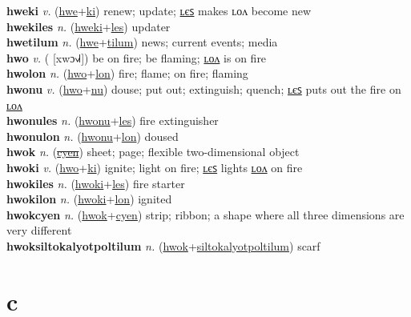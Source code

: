 \textbf{hweki} \textit{v.} (\hyperref[hwe]{hwe}+\hyperref[ki]{ki})
renew; update; \hyperref[hwekiles]{ʟєꜱ} makes ʟᴏᴧ become new \label{hweki} \\
\textbf{hwekiles} \textit{n.} (\hyperref[hweki]{hweki}+\hyperref[les]{les})
updater \label{hwekiles} \\
\textbf{hwetilum} \textit{n.} (\hyperref[hwe]{hwe}+\hyperref[tilum]{tilum})
news; current events; media \label{hwetilum} \\
\textbf{hwo} \textit{v.} ( [xwɔ˧˩˧])
be on fire; be flaming; \hyperref[hwolon]{ʟᴏᴧ} is on fire \label{hwo} \\
\textbf{hwolon} \textit{n.} (\hyperref[hwo]{hwo}+\hyperref[lon]{lon})
fire; flame; on fire; flaming \label{hwolon} \\
\textbf{hwonu} \textit{v.} (\hyperref[hwo]{hwo}+\hyperref[nu]{nu})
douse; put out; extinguish; quench; \hyperref[hwonules]{ʟєꜱ} puts out the fire on \hyperref[hwonulon]{ʟᴏᴧ} \label{hwonu} \\
\textbf{hwonules} \textit{n.} (\hyperref[hwonu]{hwonu}+\hyperref[les]{les})
fire extinguisher \label{hwonules} \\
\textbf{hwonulon} \textit{n.} (\hyperref[hwonu]{hwonu}+\hyperref[lon]{lon})
doused \label{hwonulon} \\
\textbf{hwok} \textit{n.} (\hyperref[cyen]{\sout{cyen}})
sheet; page; flexible two-dimensional object \label{hwok} \\
\textbf{hwoki} \textit{v.} (\hyperref[hwo]{hwo}+\hyperref[ki]{ki})
ignite; light on fire; \hyperref[hwokiles]{ʟєꜱ} lights \hyperref[hwokilon]{ʟᴏᴧ} on fire \label{hwoki} \\
\textbf{hwokiles} \textit{n.} (\hyperref[hwoki]{hwoki}+\hyperref[les]{les})
fire starter \label{hwokiles} \\
\textbf{hwokilon} \textit{n.} (\hyperref[hwoki]{hwoki}+\hyperref[lon]{lon})
ignited \label{hwokilon} \\
\textbf{hwokcyen} \textit{n.} (\hyperref[hwok]{hwok}+\hyperref[cyen]{cyen})
strip; ribbon; a shape where all three dimensions are very different \label{hwokcyen} \\
\textbf{hwoksiltokalyotpoltilum} \textit{n.} (\hyperref[hwok]{hwok}+\hyperref[siltokalyotpoltilum]{siltokalyotpoltilum})
scarf \label{hwoksiltokalyotpoltilum} 

\section{c}

